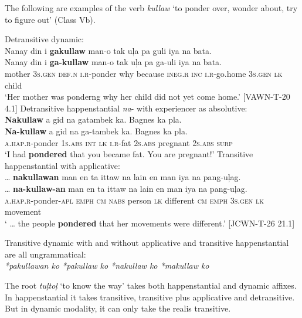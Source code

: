 The following are examples of the verb \textit{kullaw} ‘to ponder over, wonder about, try to figure out’ (Class Vb).

\ea
Detransitive dynamic: \\
Nanay  din  i  \textbf{gakullaw}  man-o  tak  uļa  pa  guli  iya  na bata. \\\smallskip
\gll Nanay  din  i  \textbf{ga-kullaw}  man-o  tak  uļa  pa  ga-uli  iya  na bata. \\
mother  3\textsc{s.gen}  \textsc{def.n}  \textsc{i.r}-ponder  why  because  \textsc{ineg.r}  \textsc{inc}  \textsc{i.r}-go.home  3\textsc{s.gen}  \textsc{lk} child \\
\glt `Her mother was ponderng why her child did not yet come home.’ [VAWN-T-20 4.1]
\z
\ea
Detransitive happenstantial \textit{na}{}- with experiencer as absolutive: \\
\textbf{Nakullaw}  a  gid  na  gatambek  ka.  Bagnes  ka  pla. \\\smallskip
\gll \textbf{Na-kullaw}  a  gid  na  ga-tambek  ka.  Bagnes  ka  pla. \\
\textsc{a.hap.r}-ponder  1\textsc{s.abs}  \textsc{int}  \textsc{lk}  \textsc{i.r}-fat  2\textsc{s.abs}  pregnant  2\textsc{s.abs}  \textsc{surp} \\
\glt ‘I had \textbf{pondered} that you became fat. You are pregnant!’
\z
\ea
Transitive happenstantial with applicative: \\
  … \textbf{nakullawan}  man  en  ta  ittaw  na  lain  en man  iya  na  pang-uļag. \\\smallskip
\gll  … \textbf{na-kullaw-an}  man  en  ta  ittaw  na  lain  en man  iya  na  pang-uļag. \\
{} \textsc{a.hap.r}-ponder-\textsc{apl}  \textsc{emph}  \textsc{cm}  \textsc{nabs}  person  \textsc{lk}  different  \textsc{cm} \textsc{emph}  3\textsc{s.gen}  \textsc{lk}  movement \\
\glt ` … the people \textbf{pondered} that her movements were different.’ [JCWN-T-26 21.1]
\z

\ea
Transitive dynamic with and without applicative and transitive happenstantial are all ungrammatical: \\
\textit{*pakullawan ko *pakullaw ko  *nakullaw ko *makullaw ko}  
\z

The root \textit{tuļtoļ} ‘to know the way’ takes both happenstantial and dynamic affixes. In happenstantial it takes transitive, transitive plus applicative and detransitive. But in dynamic modality, it can only take the realis transitive.

